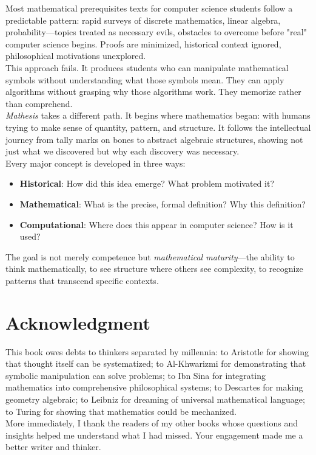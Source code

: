 Most mathematical prerequisites texts for computer science students follow a predictable pattern: rapid surveys of discrete mathematics, linear algebra, probability—topics treated as necessary evils, obstacles to overcome before "real" computer science begins. Proofs are minimized, historical context ignored, philosophical motivations unexplored.\\
This approach fails. It produces students who can manipulate mathematical symbols without understanding what those symbols mean. They can apply algorithms without grasping why those algorithms work. They memorize rather than comprehend.\\
\textit{Mathesis} takes a different path. It begins where mathematics began: with humans trying to make sense of quantity, pattern, and structure. It follows the intellectual journey from tally marks on bones to abstract algebraic structures, showing not just what we discovered but why each discovery was necessary.\\
Every major concept is developed in three ways:
\begin{itemize}
    \item \textbf{Historical}: How did this idea emerge? What problem motivated it?
    \item \textbf{Mathematical}: What is the precise, formal definition? Why this definition?
    \item \textbf{Computational}: Where does this appear in computer science? How is it used?
\end{itemize}
The goal is not merely competence but \textit{mathematical maturity}—the ability to think mathematically, to see structure where others see complexity, to recognize patterns that transcend specific contexts.

\section*{Acknowledgment}

This book owes debts to thinkers separated by millennia: to Aristotle for showing that thought itself can be systematized; to Al-Khwarizmi for demonstrating that symbolic manipulation can solve problems; to Ibn Sina for integrating mathematics into comprehensive philosophical systems; to Descartes for making geometry algebraic; to Leibniz for dreaming of universal mathematical language; to Turing for showing that mathematics could be mechanized.\\
More immediately, I thank the readers of my other books whose questions and insights helped me understand what I had missed. Your engagement made me a better writer and thinker.

